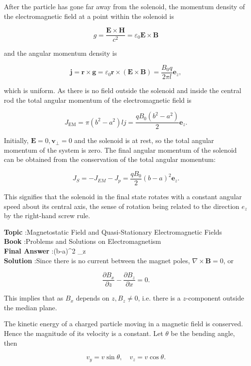 \documentclass[10pt]{article}
\begin{document}
 After the particle has gone far away from the solenoid, the momentum density of the electromagnetic field at a point within the solenoid is

$$
g=\frac{\mathbf{E} \times \mathbf{H}}{c^{2}}=\varepsilon_{0} \mathbf{E} \times \mathbf{B}
$$

and the angular momentum density is

$$
\mathbf{j}=\mathbf{r} \times \mathbf{g}=\varepsilon_{0} \mathbf{r} \times(\mathbf{E} \times \mathbf{B})=\frac{B_{0} q}{2 \pi l} \mathbf{e}_{z},
$$

which is uniform. As there is no field outside the solenoid and inside the central rod the total angular momentum of the electromagnetic field is

$$
J_{\mathrm{EM}}=\pi\left(b^{2}-a^{2}\right) l j=\frac{q B_{0}\left(b^{2}-a^{2}\right)}{2} \mathbf{e}_{z} .
$$

Initially, $\mathbf{E}=0, \mathbf{v}_{\perp}=0$ and the solenoid is at rest, so the total angular momentum of the system is zero. The final angular momentum of the solenoid can be obtained from the conservation of the total angular momentum:

$$
J_{S}=-J_{E M}-J_{p}=\frac{q B_{0}}{2}(b-a)^{2} \mathbf{e}_{z} .
$$

This signifies that the solenoid in the final state rotates with a constant angular speed about its central axis, the sense of rotation being related to the direction $e_{z}$ by the right-hand screw rule.

\textbf{Topic} :Magnetostatic Field and Quasi-Stationary Electromagnetic Fields\\
\textbf{Book} :Problems and Solutions on Electromagnetism\\
\textbf{Final Answer} :(b-a)^{2} _{z}\\


\textbf{Solution} :Since there is no current between the magnet poles, $\nabla \times \mathbf{B}=0$, or

$$
\frac{\partial B_{x}}{\partial z}-\frac{\partial B_{z}}{\partial x}=0 .
$$

This implies that as $B_{x}$ depends on $z, B_{z} \neq 0$, i.e. there is a $z$-component outside the median plane.

The kinetic energy of a charged particle moving in a magnetic field is conserved. Hence the magnitude of its velocity is a constant. Let $\theta$ be the bending angle, then

$$
v_{y}=v \sin \theta, \quad v_{z}=v \cos \theta .
$$
\end{document}
